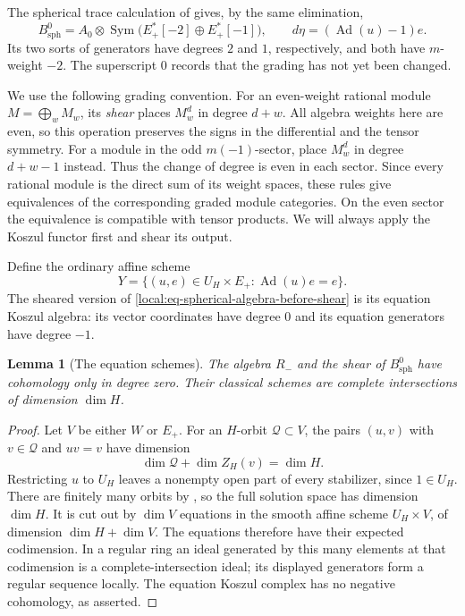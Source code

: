 \documentclass[11pt]{article}
\numberwithin{equation}{section}
\newtheorem{lemma}[theorem]{Lemma}
\theoremstyle{definition}
\theoremstyle{remark}
\newcommand{\Ad}{\operatorname{Ad}}
\newcommand{\Sym}{\operatorname{Sym}}
\begin{document}
The spherical trace calculation of \cite[Proposition~2.7, ``Spectral form
of a Frobenius trace'']{Parent} gives, by the same elimination,
\begin{equation}\label{local:eq-spherical-algebra-before-shear}
 B_{\mathrm{sph}}^0
 =A_0\otimes\Sym\bigl(E_+^*[-2]\oplus E_+^*[-1]\bigr),
 \qquad d\eta=(\Ad(u)-1)e.
\end{equation}
Its two sorts of generators have degrees $2$ and $1$, respectively,
and both have $m$-weight $-2$.  The superscript $0$ records that the
grading has not yet been changed.

We use the following grading convention.  For an even-weight rational
module $M=\bigoplus_w M_w$, its \emph{shear} places $M_w^d$ in degree
$d+w$.  All algebra weights here are even, so this operation preserves
the signs in the differential and the tensor symmetry.  For a module
in the odd $m(-1)$-sector, place $M_w^d$ in degree $d+w-1$ instead.
Thus the change of degree is even in each sector.  Since every rational
module is the direct sum of its weight spaces, these rules give
equivalences of the corresponding graded module categories.  On the
even sector the equivalence is compatible with tensor products.  We
will always apply the Koszul functor first and shear its output.

Define the ordinary affine scheme
\begin{equation}\label{local:eq-positive-space}
 Y=\{(u,e)\in U_H\times E_+:\Ad(u)e=e\}.
\end{equation}
The sheared version of
\eqref{local:eq-spherical-algebra-before-shear} is its equation Koszul
algebra: its vector coordinates have degree $0$ and its equation
generators have degree $-1$.

\begin{lemma}[The equation schemes]\label{local:equation-models}
The algebra $R_-$ and the shear of $B_{\mathrm{sph}}^0$ have
cohomology only in degree zero.  Their classical schemes are complete
intersections of dimension $\dim H$.
\end{lemma}

\begin{proof}
Let $V$ be either $W$ or $E_+$.  For an $H$-orbit $\mathcal Q\subset V$,
the pairs $(u,v)$ with $v\in\mathcal Q$ and $uv=v$ have dimension
\[
 \dim\mathcal Q+\dim Z_H(v)=\dim H.
\]
Restricting $u$ to $U_H$ leaves a nonempty open part of every
stabilizer, since $1\in U_H$.  There are finitely many orbits by
\cite[Lemma~3.6, ``Resonance orbits'']{Parent}, so the full solution
space has dimension $\dim H$.  It is cut out by $\dim V$ equations
in the smooth affine scheme $U_H\times V$, of dimension
$\dim H+\dim V$.  The equations therefore have their expected
codimension.  In a regular ring an ideal generated by this many
elements at that codimension is a complete-intersection ideal; its
displayed generators form a regular sequence locally.  The equation
Koszul complex has no negative cohomology, as asserted.
\end{proof}
\end{document}
